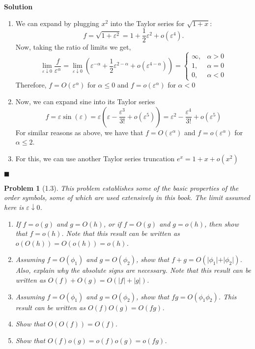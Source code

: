 \documentclass[11pt]{article}
\newcommand{\vep}{\varepsilon}
\theoremstyle{problemstyle}
\newtheorem{problem}{Problem}
\newenvironment{solution}
  {\noindent\textbf{Solution}\quad}
  {\hfill$\blacksquare$\par\vspace{1em}}
\begin{document}
\begin{solution}
  \begin{enumerate}[label=(\roman*)]
    \item We can expand by plugging $x^2$ into the Taylor series for $\sqrt{1+x}$:
      \[ f = \sqrt{1 + \vep^2} = 1 + \frac{1}{2}\vep^2 + o(\vep^4). \]
      Now, taking the ratio of limits we get,
      \[ \lim_{\vep \downarrow 0} \frac{f}{\vep^\alpha} = \lim_{\vep \downarrow 0}
        \left(\vep^{-\alpha} + \frac{1}{2}\vep^{2-\alpha} + o(\vep^{4-\alpha}) \right) =
        \begin{cases}
        \infty, & \alpha > 0 \\
        1 , & \alpha = 0 \\
        0 , & \alpha < 0 
      \end{cases}\]
      Therefore, $f = O(\vep^\alpha)$ for $\alpha \leq 0$ and $f = o(\vep^\alpha)$ for $\alpha < 0$
    \item Now, we can expand sine into its Taylor series
      \[ f = \vep \sin(\vep) = \vep \left( \vep - \frac{\vep^3}{3!} + o(\vep^5) \right) = \vep^2 -
      \frac{\vep^4}{3!} + o(\vep^5) \]
      For similar reasons as above, we have that $f = O(\vep^\alpha)$ and $f = o(\vep^\alpha)$ for
      $\alpha \leq 2$.
    \item For this, we can use another Taylor series truncation $e^x = 1 + x + o(x^2)$
      

  \end{enumerate}
\end{solution}

\begin{problem}[1.3]
This problem establishes some of the basic properties of the order symbols, some of which are used
extensively in this book. The limit assumed here is $\vep \downarrow 0$.
\begin{enumerate}
\item If $f = o(g)$ and $g = O(h)$, or if $f = O(g)$ and $g = o(h)$, then show that $f = o(h)$. Note
  that this result can be written as $o(O(h)) = O(o(h)) = o(h)$.
\item Assuming $f = O(\phi_1)$ and $g = O(\phi_2)$, show that $f + g = O(\vert \phi_1 \vert  + \vert
  \phi_2 \vert)$. Also, explain why the absolute signs are necessary. Note that this result can be
  written as $O(f) + O(g) = O(|f| + |g|)$.
\item Assuming $f = O(\phi_1)$ and $g = O(\phi_2)$, show that $fg = O(\phi_1 \phi_2)$. This result
  can be written as $O(f) O(g) = O(fg)$.
\item Show that $O(O(f)) = O(f)$.
\item Show that $O(f)o(g) = o(f)o(g) = o(fg)$.
\end{enumerate}
\end{problem}
\end{document}
